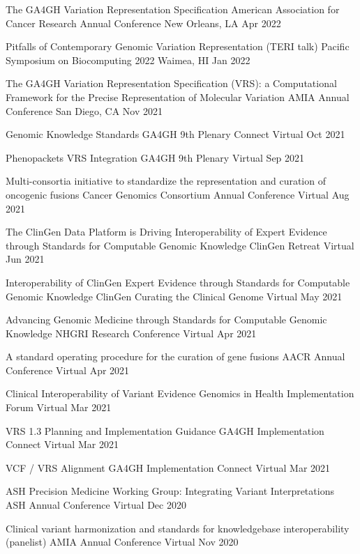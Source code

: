 \poster
{The GA4GH Variation Representation Specification}
{American Association for Cancer Research Annual Conference}
{New Orleans, LA}
{Apr 2022}

\invited
{Pitfalls of Contemporary Genomic Variation Representation (TERI talk)}
{Pacific Symposium on Biocomputing 2022}
{Waimea, HI}
{Jan 2022}

\oral
{The GA4GH Variation Representation Specification (VRS): a Computational Framework for the Precise Representation of Molecular Variation}
{AMIA Annual Conference}
{San Diego, CA}
{Nov 2021}

\invited
{Genomic Knowledge Standards}
{GA4GH 9th Plenary Connect}
{Virtual}
{Oct 2021}

\invited
{Phenopackets VRS Integration}
{GA4GH 9th Plenary}
{Virtual}
{Sep 2021}

\oral
{Multi-consortia initiative to standardize the representation and curation of oncogenic fusions}
{Cancer Genomics Consortium Annual Conference}
{Virtual}
{Aug 2021}

\oral
{The ClinGen Data Platform is Driving Interoperability of Expert Evidence through Standards for Computable Genomic Knowledge}
{ClinGen Retreat}
{Virtual}
{Jun 2021}

\oral
{Interoperability of ClinGen Expert Evidence through Standards for Computable Genomic Knowledge}
{ClinGen Curating the Clinical Genome}
{Virtual}
{May 2021}

\poster
{Advancing Genomic Medicine through Standards for Computable Genomic Knowledge}
{NHGRI Research Conference}
{Virtual}
{Apr 2021}

\poster
{A standard operating procedure for the curation of gene fusions}
{AACR Annual Conference}
{Virtual}
{Apr 2021}

\invited
{Clinical Interoperability of Variant Evidence}
{Genomics in Health Implementation Forum}
{Virtual}
{Mar 2021}

\invited
{VRS 1.3 Planning and Implementation Guidance}
{GA4GH Implementation Connect}
{Virtual}
{Mar 2021}

\invited
{VCF / VRS Alignment}
{GA4GH Implementation Connect}
{Virtual}
{Mar 2021}

\invited
{ASH Precision Medicine Working Group: Integrating Variant Interpretations}
{ASH Annual Conference}
{Virtual}
{Dec 2020}

\oral
{Clinical variant harmonization and standards for knowledgebase interoperability (panelist)}
{AMIA Annual Conference}
{Virtual}
{Nov 2020}


